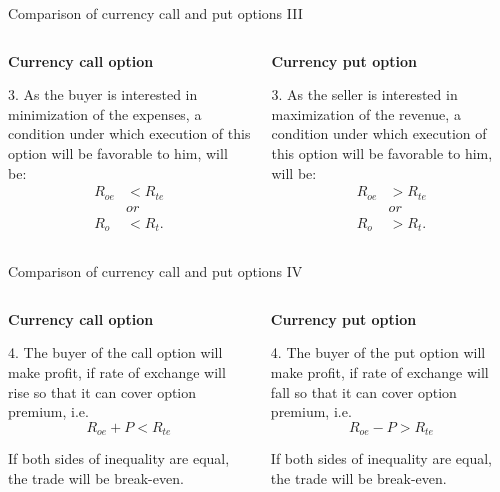 \documentclass[international_finance_p1.tex]{subfiles}
\begin{document}
\begin{frame}{Comparison of currency call and put options III}
\begin{columns}
\begin{column}{0.5\textwidth}
\textbf{Currency call option}

3. As the buyer is interested in minimization of the expenses, a condition under which execution of this option will be favorable to him, will be:
\begin{align*}
 R_{oe} &< R_{te}\\ 
 &or \\
 R_o &< R_t.
\end{align*}
\end{column}
\begin{column}{0.5\textwidth}  %
\textbf{Currency put option}

3. As the seller is interested in maximization of the revenue, a condition under which execution of this option will be favorable to him, will be:
\begin{align*}
 R_{oe} &> R_{te}\\ 
 &or \\
 R_o &> R_t.
\end{align*}
\end{column}
\end{columns}
\end{frame}


\begin{frame}{Comparison of currency call and put options IV}
\begin{columns}
\begin{column}{0.5\textwidth}
\textbf{Currency call option}

4. The buyer of the call option will make profit, if rate of exchange will rise so that it can cover option premium, i.e.
$$R_{oe} + P < R_{te}$$

If both sides of inequality are equal, the trade will be break-even.
\end{column}
\begin{column}{0.5\textwidth}  %
\textbf{Currency put option}

4. The buyer of the put option will make profit, if rate of exchange will fall so that it can cover option premium, i.e.
$$R_{oe}-P>R_{te}$$

If both sides of inequality are equal, the trade will be break-even.
\end{column}
\end{columns}
\end{frame}
\end{document}
